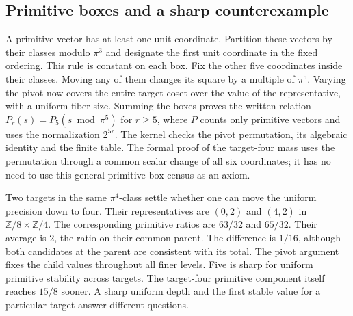 \documentclass[12pt,letterpaper]{article}
\begin{document}
\subsection{Primitive boxes and a sharp counterexample}
A primitive vector has at least one unit coordinate. Partition these vectors by their classes modulo $\pi^3$ and designate the first unit coordinate in the fixed ordering. This rule is constant on each box. Fix the other five coordinates inside their classes. Moving any of them changes its square by a multiple of $\pi^5$. Varying the pivot now covers the entire target coset over the value of the representative, with a uniform fiber size. Summing the boxes proves the written relation $P_r(s)=P_5(s\bmod\pi^5)$ for $r\ge5$, where $P$ counts only primitive vectors and uses the normalization $2^{5r}$. The kernel checks the pivot permutation, its algebraic identity and the finite table. The formal proof of the target-four mass uses the permutation through a common scalar change of all six coordinates; it has no need to use this general primitive-box census as an axiom.
\par
Two targets in the same $\pi^4$-class settle whether one can move the uniform precision down to four. Their representatives are $(0,2)$ and $(4,2)$ in $\mathbb Z/8\times\mathbb Z/4$. The corresponding primitive ratios are $63/32$ and $65/32$. Their average is $2$, the ratio on their common parent. The difference is $1/16$, although both candidates at the parent are consistent with its total. The pivot argument fixes the child values throughout all finer levels. Five is sharp for uniform primitive stability across targets. The target-four primitive component itself reaches $15/8$ sooner. A sharp uniform depth and the first stable value for a particular target answer different questions.
\end{document}
